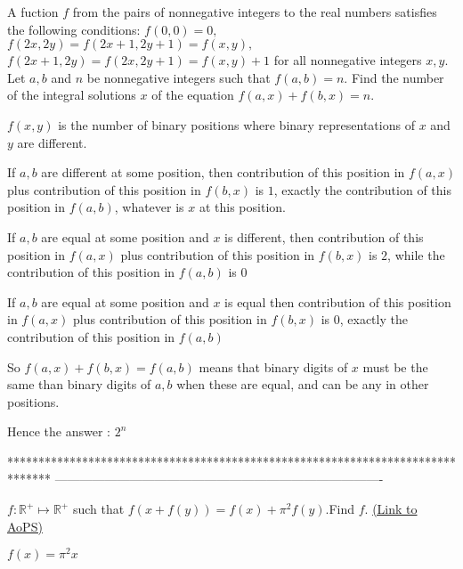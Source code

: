 \begin{solution}
	\begin{tcolorbox}A fuction $f$ from the pairs of nonnegative integers to the  real numbers satisfies the following  conditions:
$f(0,0)=0,$   $f(2x,2y)=f(2x+1,2y+1)=f(x,y),$  $f(2x+1,2y)=f(2x,2y+1)=f(x,y)+1$ 
for all nonnegative  integers $x,y$.  Let  $a,b$ and $n$ be nonnegative integers  such that  $f(a,b)=n$.  Find the number of the integral  solutions $x$ of the  equation  $f(a,x)+f(b,x)=n.$\end{tcolorbox}
$f(x,y)$ is the number of binary positions where binary representations of $x$ and $y$ are different.

If $a,b$ are different at some position, then contribution of this position in $f(a,x)$ plus contribution of this position in $f(b,x)$ is $1$, exactly the contribution of this position in $f(a,b)$, whatever is $x$ at this position.

If $a,b$ are equal at some position and $x$ is different, then contribution of this position in $f(a,x)$ plus contribution of this position in $f(b,x)$ is $2$, while the contribution of this position in $f(a,b)$ is $0$

If $a,b$ are equal at some position and $x$ is equal then contribution of this position in $f(a,x)$ plus contribution of this position in $f(b,x)$ is $0$, exactly the contribution of this position in $f(a,b)$

So $f(a,x)+f(b,x)=f(a,b)$ means that binary digits of $x$ must be the same than binary digits of $a,b$ when these are equal, and can be any in other positions.

Hence the answer : $\boxed{2^n}$
\end{solution}
*******************************************************************************
-------------------------------------------------------------------------------

\begin{problem}
	$f:\mathbb{R}^+ \mapsto\mathbb{R}^+$ such that $f(x+f(y))=f(x)+\pi^2 f(y)$.Find $f$.
	\flushright \href{https://artofproblemsolving.com/community/c6h537941}{(Link to AoPS)}
\end{problem}



\begin{solution}
	$f(x)={{\pi }^{2}}x$
\end{solution}



